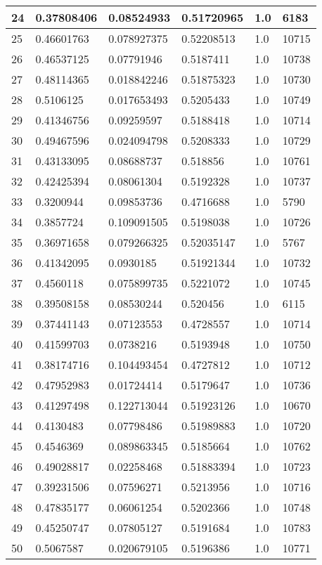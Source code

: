 \begin{longtable}{|l|l|l|l|l|l|}
24 & 0.37808406 & 0.08524933 & 0.51720965 & 1.0 & 6183 \\ \hline 
25 & 0.46601763 & 0.078927375 & 0.52208513 & 1.0 & 10715 \\ \hline 
26 & 0.46537125 & 0.07791946 & 0.5187411 & 1.0 & 10738 \\ \hline 
27 & 0.48114365 & 0.018842246 & 0.51875323 & 1.0 & 10730 \\ \hline 
28 & 0.5106125 & 0.017653493 & 0.5205433 & 1.0 & 10749 \\ \hline 
29 & 0.41346756 & 0.09259597 & 0.5188418 & 1.0 & 10714 \\ \hline 
30 & 0.49467596 & 0.024094798 & 0.5208333 & 1.0 & 10729 \\ \hline 
31 & 0.43133095 & 0.08688737 & 0.518856 & 1.0 & 10761 \\ \hline 
32 & 0.42425394 & 0.08061304 & 0.5192328 & 1.0 & 10737 \\ \hline 
33 & 0.3200944 & 0.09853736 & 0.4716688 & 1.0 & 5790 \\ \hline 
34 & 0.3857724 & 0.109091505 & 0.5198038 & 1.0 & 10726 \\ \hline 
35 & 0.36971658 & 0.079266325 & 0.52035147 & 1.0 & 5767 \\ \hline 
36 & 0.41342095 & 0.0930185 & 0.51921344 & 1.0 & 10732 \\ \hline 
37 & 0.4560118 & 0.075899735 & 0.5221072 & 1.0 & 10745 \\ \hline 
38 & 0.39508158 & 0.08530244 & 0.520456 & 1.0 & 6115 \\ \hline 
39 & 0.37441143 & 0.07123553 & 0.4728557 & 1.0 & 10714 \\ \hline 
40 & 0.41599703 & 0.0738216 & 0.5193948 & 1.0 & 10750 \\ \hline 
41 & 0.38174716 & 0.104493454 & 0.4727812 & 1.0 & 10712 \\ \hline 
42 & 0.47952983 & 0.01724414 & 0.5179647 & 1.0 & 10736 \\ \hline 
43 & 0.41297498 & 0.122713044 & 0.51923126 & 1.0 & 10670 \\ \hline 
44 & 0.4130483 & 0.07798486 & 0.51989883 & 1.0 & 10720 \\ \hline 
45 & 0.4546369 & 0.089863345 & 0.5185664 & 1.0 & 10762 \\ \hline 
46 & 0.49028817 & 0.02258468 & 0.51883394 & 1.0 & 10723 \\ \hline 
47 & 0.39231506 & 0.07596271 & 0.5213956 & 1.0 & 10716 \\ \hline 
48 & 0.47835177 & 0.06061254 & 0.5202366 & 1.0 & 10748 \\ \hline 
49 & 0.45250747 & 0.07805127 & 0.5191684 & 1.0 & 10783 \\ \hline 
50 & 0.5067587 & 0.020679105 & 0.5196386 & 1.0 & 10771 \\ \hline 
\end{longtable}